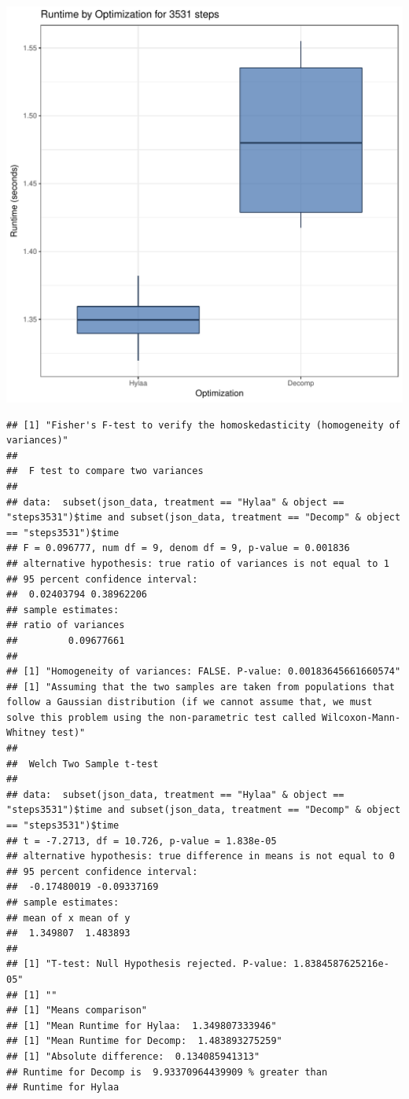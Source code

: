 \documentclass{article}\usepackage[]{graphicx}\usepackage[]{color}
\makeatletter
\def\maxwidth{ %
  \ifdim\Gin@nat@width>\linewidth
    \linewidth
  \else
    \Gin@nat@width
  \fi
}
\newenvironment{kframe}{%
 \def\at@end@of@kframe{}%
 \ifinner\ifhmode%
  \def\at@end@of@kframe{\end{minipage}}%
  \begin{minipage}{\columnwidth}%
 \fi\fi%
 \def\FrameCommand##1{\hskip\@totalleftmargin \hskip-\fboxsep
 \colorbox{shadecolor}{##1}\hskip-\fboxsep
     \hskip-\linewidth \hskip-\@totalleftmargin \hskip\columnwidth}%
 \MakeFramed {\advance\hsize-\width
   \@totalleftmargin\z@ \linewidth\hsize
   \@setminipage}}%
 {\par\unskip\endMakeFramed%
 \at@end@of@kframe}
\newenvironment{knitrout}{}{} %
\makeatother
\begin{document}
\begin{knitrout}
\color{fgcolor}
\includegraphics[width=\maxwidth]{figure/RH2_steps3531-1} 
\begin{kframe}\begin{verbatim}
## [1] "Fisher's F-test to verify the homoskedasticity (homogeneity of variances)"
## 
## 	F test to compare two variances
## 
## data:  subset(json_data, treatment == "Hylaa" & object == "steps3531")$time and subset(json_data, treatment == "Decomp" & object == "steps3531")$time
## F = 0.096777, num df = 9, denom df = 9, p-value = 0.001836
## alternative hypothesis: true ratio of variances is not equal to 1
## 95 percent confidence interval:
##  0.02403794 0.38962206
## sample estimates:
## ratio of variances 
##         0.09677661 
## 
## [1] "Homogeneity of variances: FALSE. P-value: 0.00183645661660574"
## [1] "Assuming that the two samples are taken from populations that follow a Gaussian distribution (if we cannot assume that, we must solve this problem using the non-parametric test called Wilcoxon-Mann-Whitney test)"
## 
## 	Welch Two Sample t-test
## 
## data:  subset(json_data, treatment == "Hylaa" & object == "steps3531")$time and subset(json_data, treatment == "Decomp" & object == "steps3531")$time
## t = -7.2713, df = 10.726, p-value = 1.838e-05
## alternative hypothesis: true difference in means is not equal to 0
## 95 percent confidence interval:
##  -0.17480019 -0.09337169
## sample estimates:
## mean of x mean of y 
##  1.349807  1.483893 
## 
## [1] "T-test: Null Hypothesis rejected. P-value: 1.8384587625216e-05"
## [1] ""
## [1] "Means comparison"
## [1] "Mean Runtime for Hylaa:  1.349807333946"
## [1] "Mean Runtime for Decomp:  1.483893275259"
## [1] "Absolute difference:  0.134085941313"
## Runtime for Decomp is  9.93370964439909 % greater than 
## Runtime for Hylaa
\end{verbatim}
\end{kframe}
\end{knitrout}
\end{document}
